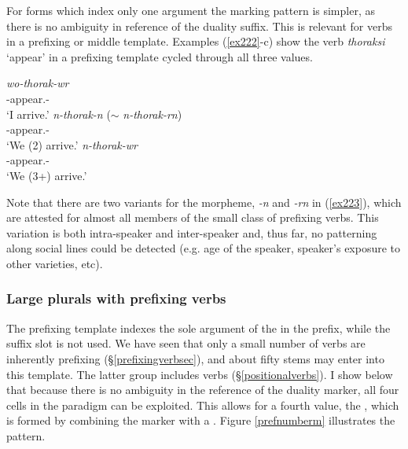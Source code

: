 For  forms which index only one argument the marking pattern is simpler, as there is no ambiguity in reference of the duality suffix. This is relevant for verbs in a prefixing or middle template. Examples (\ref{ex222}-c) show the verb \emph{thoraksi} `appear' in a prefixing template cycled through all three  values.

\begin{exe}
\ex
\begin{xlist}
	\ex
	\gll \emph{wo-thorak-wr}\\
	\Fsg-appear.\Ext-\Ndu\\
	\trans `I arrive.'
	\label{ex222}
	\ex
	\gll \emph{n-thorak-n} ($\sim$ \emph{n-thorak-rn})\\
	\Fnsg-appear.\Ext-\Du{}\\
	\trans `We (2) arrive.'
	\label{ex223}
	\ex
	\gll \emph{n-thorak-wr}\\
	\Fnsg-appear.\Ext-\Ndu\\
	\trans `We (3+) arrive.'
	\label{ex224}
\end{xlist}
\end{exe}

Note that there are two variants for the  morpheme, \emph{-n} and \emph{-rn} in (\ref{ex223}), which are attested for almost all members of the small class of prefixing verbs. This variation is both intra-speaker and inter-speaker and, thus far, no patterning along social lines could be detected (e.g. age of the speaker, speaker's exposure to other varieties, etc).

\subsubsection{Large plurals with prefixing verbs} \label{positonalnumber}

The prefixing template indexes the sole argument of the  in the prefix, while the suffix slot is not used. We have seen that only a small number of verbs are inherently prefixing (\S{}\ref{prefixingverbsec}), and about fifty stems may enter into this template. The latter group includes  verbs (\S{}\ref{positionalverbs}). I show below that because there is no ambiguity in the reference of the duality marker, all four cells in the paradigm can be exploited. This allows for a fourth  value, the , which is formed by combining the  marker with a . Figure \ref{prefnumberm} illustrates the pattern.

